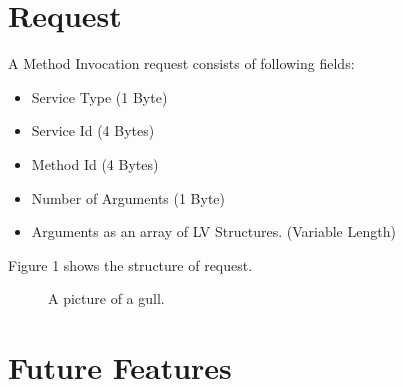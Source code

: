 \documentclass[10pt,a4paper]{article}
\begin{document}
\section {Request}
A Method Invocation request consists of following fields:
\begin{itemize}
  \item Service Type (1 Byte)
  \item Service Id (4 Bytes)
  \item Method Id (4 Bytes)
  \item Number of Arguments (1 Byte)
  \item Arguments as an array of LV Structures. (Variable Length)
\end{itemize}
Figure 1 shows the structure of request.
\begin{figure}[!ht]
  \caption{A picture of a gull.}
  \centering
\end{figure}

\section {Future Features}
\end{document}
